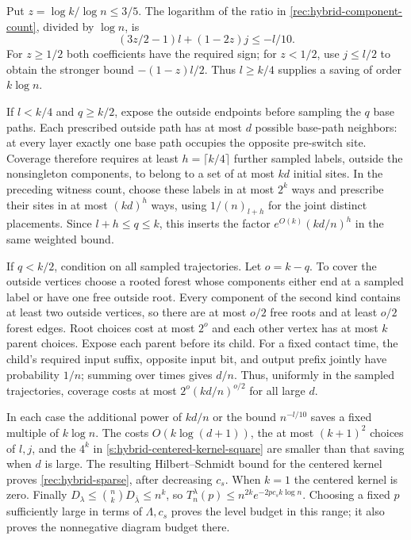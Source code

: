 Put $z=\log k/\log n\le3/5$. The logarithm of the ratio in
\eqref{rec:hybrid-component-count}, divided by $\log n$, is
\[
 (3z/2-1)l+(1-2z)j\le-l/10.
\]
For $z\ge1/2$ both coefficients have the required sign; for
$z<1/2$, use $j\le l/2$ to obtain the stronger bound
$-(1-z)l/2$. Thus $l\ge k/4$ supplies a saving of order
$k\log n$.

If $l<k/4$ and $q\ge k/2$, expose the outside endpoints before
sampling the $q$ base paths. Each prescribed outside path has at
most $d$ possible base-path neighbors: at every layer exactly one
base path occupies the opposite pre-switch site. Coverage therefore
requires at least $h=\lceil k/4\rceil$ further sampled labels,
outside the nonsingleton components, to belong to a set of at most
$kd$ initial sites. In the preceding witness count, choose these
labels in at most $2^k$ ways and prescribe their sites in at most
$(kd)^h$ ways, using $1/(n)_{l+h}$ for the joint distinct placements.
Since $l+h\le q\le k$, this inserts the factor
$e^{O(k)}(kd/n)^h$ in the same weighted bound.

If $q<k/2$, condition on all sampled trajectories. Let $o=k-q$.
To cover the outside vertices choose a rooted forest whose components
either end at a sampled label or have one free outside root.
Every component of the second kind contains at least two outside
vertices, so there are at most $o/2$ free roots and at least $o/2$
forest edges. Root choices cost at most $2^o$ and each other vertex
has at most $k$ parent choices. Expose each parent before its child.
For a fixed contact time, the child's required input suffix,
opposite input bit, and output prefix jointly have probability
$1/n$; summing over times gives $d/n$. Thus, uniformly in the sampled
trajectories, coverage costs at most
$2^o(kd/n)^{o/2}$ for all large $d$.

In each case the additional power of $kd/n$ or the bound
$n^{-l/10}$ saves a fixed multiple of $k\log n$.
The costs $O(k\log(d+1))$, the at most $(k+1)^2$ choices of $l,j$,
and the $4^k$ in \eqref{s:hybrid-centered-kernel-square} are smaller
than that saving when $d$ is large. The resulting Hilbert--Schmidt
bound for the centered kernel proves \eqref{rec:hybrid-sparse},
after decreasing $c_s$. When $k=1$ the centered kernel is zero.
Finally $D_\lambda\le\binom nkD_{\bar\lambda}\le n^k$, so
$T_n^\lambda(p)\le n^{2k}e^{-2pc_s k\log n}$.
Choosing a fixed $p$ sufficiently large in terms of $\Lambda,c_s$
proves the level budget in this range; it also proves the nonnegative
diagram budget there.

